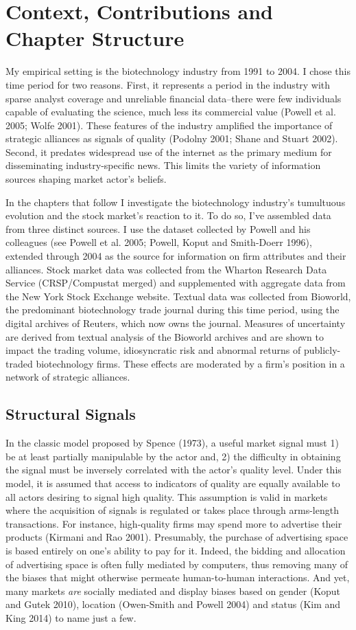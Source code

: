 \section{Context, Contributions and Chapter Structure}

My empirical setting is the biotechnology industry from 1991 to 2004. I chose this time period for two reasons. First, it represents a period in the industry with sparse analyst coverage and unreliable financial data--there were few individuals capable of evaluating the science, much less its commercial value (Powell et al. 2005; Wolfe 2001). These features of the industry amplified the importance of strategic alliances as signals of quality (Podolny 2001; Shane and Stuart 2002). Second, it predates widespread use of the internet as the primary medium for disseminating industry-specific news. This limits the variety of information sources shaping market actor's beliefs.

In the chapters that follow I investigate the biotechnology industry's tumultuous evolution and the stock market's reaction to it. To do so, I've assembled data from three distinct sources. I use the dataset collected by Powell and his colleagues (see Powell et al. 2005; Powell, Koput and Smith-Doerr 1996), extended through 2004 as the source for information on firm attributes and their alliances. Stock market data was collected from the Wharton Research Data Service (CRSP/Compustat merged) and supplemented with aggregate data from the New York Stock Exchange website. Textual data was collected from Bioworld, the predominant biotechnology trade journal during this time period, using the digital archives of Reuters, which now owns the journal. Measures of uncertainty are derived from textual analysis of the Bioworld archives and are shown to impact the trading volume, idiosyncratic risk and abnormal returns of publicly-traded biotechnology firms. These effects are moderated by a firm's position in a network of strategic alliances.

\subsection{Structural Signals}
In the classic model proposed by Spence (1973), a useful market signal must 1) be at least partially manipulable by the actor and, 2) the difficulty in obtaining the signal must be inversely correlated with the actor's quality level. Under this model, it is assumed that access to indicators of quality are equally available to all actors desiring to signal high quality. This assumption is valid in markets where the acquisition of signals is regulated or takes place through arms-length transactions. For instance, high-quality firms may spend more to advertise their products (Kirmani and Rao 2001). Presumably, the purchase of advertising space is based entirely on one's ability to pay for it. Indeed, the bidding and allocation of advertising space is often fully mediated by computers, thus removing many of the biases that might otherwise permeate human-to-human interactions. And yet, many markets {\it are} socially mediated and display biases based on gender (Koput and Gutek 2010), location (Owen-Smith and Powell 2004) and status (Kim and King 2014) to name just a few. 

